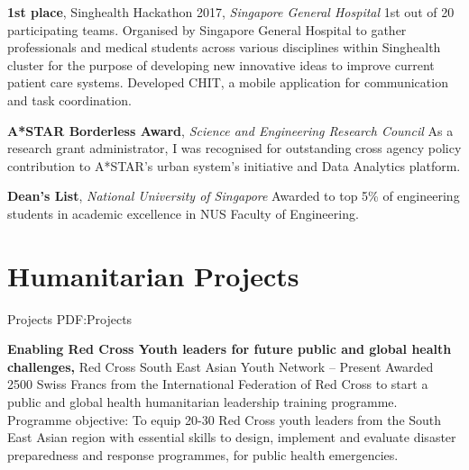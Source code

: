 \documentclass[letterpaper,10pt,oneside]{article}
\begin{document}
\begin{body}


\textbf{1st place}, \textcolor{mygray}{Singhealth Hackathon 2017}, \textit{Singapore General Hospital}
\hfill{}
\BulletItem
1st out of 20 participating teams. Organised by Singapore General Hospital to gather professionals and medical students across various disciplines within Singhealth cluster for the purpose of developing new innovative ideas to improve current patient care systems. Developed CHIT, a mobile application for communication and task coordination.
\GapNoBreak
\medskip


\textbf{A*STAR Borderless Award}, \textit{Science and Engineering Research Council}
\hfill
{}
\BulletItem
As a research grant administrator, I was recognised for outstanding cross agency policy contribution to A*STAR's urban system's initiative and Data Analytics platform.
\GapNoBreak
\medskip

\textbf{Dean's List}, \textit{National University of Singapore}
\hfill
{}
\BulletItem
Awarded to top 5\% of engineering students in academic excellence in NUS Faculty of Engineering.
\GapNoBreak


\section
{Humanitarian Projects}
{Projects}
{PDF:Projects}

\textbf{Enabling Red Cross Youth leaders for future public and global health challenges,} Red Cross South East Asian Youth Network
\hfill
{} -- Present
\BulletItem Awarded 2500 Swiss Francs from the International Federation of Red Cross to start a public and global health humanitarian leadership training programme.
\BulletItem Programme objective: To equip 20-30 Red Cross youth leaders from the South East Asian region with essential skills to design, implement and evaluate disaster preparedness and response programmes, for public health emergencies.
\GapNoBreak
\medskip


\end{body}
\end{document}
